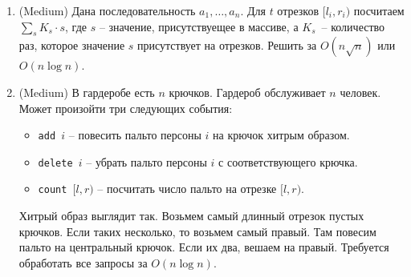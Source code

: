 \begin{enumerate}
  \item (Medium) Дана последовательность $a_1, \dots, a_n$. Для $t$ отрезков
  $[l_i, r_i)$ посчитаем $\sum_s K_s \cdot s$, где $s$ -- значение, присутствуещее
  в массиве, а $K_s$~-- количество раз, которое значение $s$ присутствует на отрезков.
  Решить за $O(n \sqrt n)$ или $O(n \log n)$.

  \item (Medium) В гардеробе есть $n$ крючков. Гардероб обслуживает $n$ человек.
  Может произойти три следующих события:
  \begin{itemize}
    \item \texttt{add $i$} -- повесить пальто персоны $i$ на крючок хитрым образом.
    \item \texttt{delete $i$} -- убрать пальто персоны $i$ с соответствующего крючка.
    \item \texttt{count $[l, r)$} -- посчитать число пальто на отрезке $[l, r)$. 
  \end{itemize}
  Хитрый образ выглядит так. Возьмем самый длинный отрезок пустых крючков. Если таких
  несколько, то возьмем самый правый. Там повесим пальто на центральный крючок.
  Если их два, вешаем на правый.
  Требуется обработать все запросы за $O(n \log n)$.

\end{enumerate}
